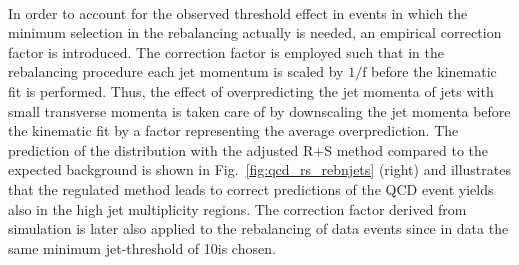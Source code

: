 \\
In order to account for the observed threshold effect in events in which the minimum \pt selection in the rebalancing actually is needed, an empirical correction factor is introduced. The correction factor is employed such that in the rebalancing procedure each jet momentum is scaled by $1/\mathrm{f}$ before the kinematic fit is performed. Thus, the effect of overpredicting the jet momenta of jets with small transverse momenta is taken care of by downscaling the jet momenta before the kinematic fit by a factor representing the average overprediction. The prediction of the \NJets distribution with the adjusted R+S method compared to the expected background is shown in Fig.~\ref{fig:qcd_rs_rebnjets} (right) and illustrates that the regulated method leads to correct predictions of the QCD event yields also in the high jet multiplicity regions. The correction factor derived from simulation is later also applied to the rebalancing of data events since in data the same minimum jet-\pt threshold of 10\gev is chosen.%

